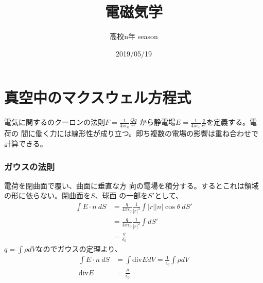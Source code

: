 \documentclass{jsarticle}
\begin{document}
\title{電磁気学}
\author{高校n年 season}
\date{2019/05/19}
\maketitle
\tableofcontents
\newcommand{\repart}[1]{\part{#1}\setcounter{section}{0}}
\newcommand{\lr}[1]{\left(#1 \right)}
\newcommand{\mlr}[1]{\left\{#1 \right\}}
\newcommand{\llr}[1]{\left[#1 \right]}
\newcommand{\na}[1]{\mathrm{#1}}
\newcommand{\rec}[1]{\frac{1}{#1}}
\newcommand{\de}[2][]{\frac{d #1}{d #2}}
\newcommand{\di}[2][]{\frac{d #1}{d #2}}
\newcommand{\dd}[2][]{\frac{d^2 #1}{d #2^2}}
\newcommand{\pd}[2][]{\frac{\partial #1}{\partial #2}}
\newcommand{\grad}{\mathrm{grad}}
\newcommand{\dive}{\mathrm{div}}
\newcommand{\rot}{\mathrm{rot}}
\repart{真空中のマクスウェル方程式}
    電気に関するのクーロンの法則$F=\rec{4\pi\epsilon_0}\frac{Qq}{r^2}$
    から静電場$E=\rec{4\pi\epsilon_0}\frac{q}{r^2}$を定義する。電荷の
    間に働く力には線形性が成り立つ。即ち複数の電場の影響は重ね合わせで計算できる。
    \section{ガウスの法則}
        電荷を閉曲面で覆い、曲面に垂直な方
        向の電場を積分する。するとこれは領域の形に依らない。閉曲面を$S$、球面
        の一部を$S'$として、
        \begin{align*}
            \int E\cdot n\ dS &= \frac{q}{4\pi\epsilon_0}
            \rec{|r|^3}\int |r||n|\cos\theta\ dS'\\
            &= \frac{q}{4\pi\epsilon_0}\rec{|r|^2}\int dS'\\
            &= \frac{q}{\epsilon_0}
        \end{align*}
        $q = \int \rho dV$なのでガウスの定理より、
        \begin{align*}
            \int E\cdot n\ dS &= \int \dive EdV = 
            \rec{\epsilon_0}\int \rho dV\\
            \dive E &= \frac{\rho}{\epsilon_0}
        \end{align*}
\end{document}
